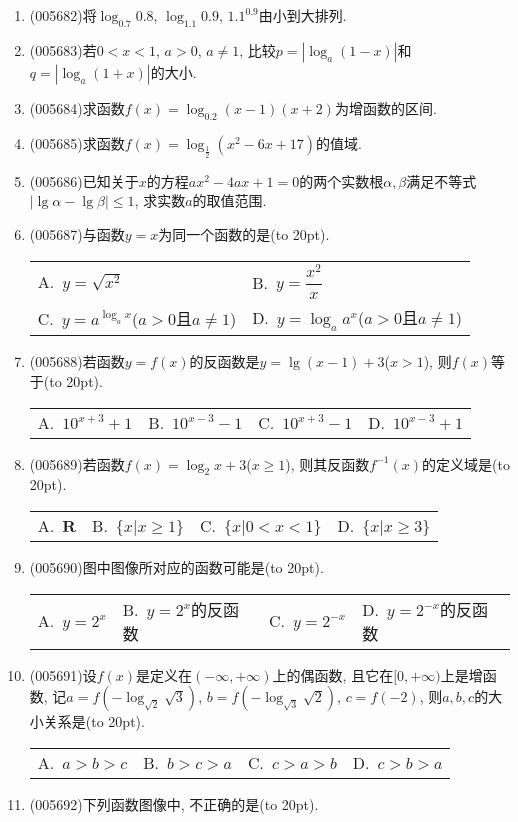 \documentclass[10pt,a4paper]{article}
\newcommand{\bracket}[1]{(\hbox to #1pt{})}
\newcommand{\twoch}[4]{\par\begin{tabular}{p{.46\textwidth}p{.46\textwidth}}
A.~#1& B.~#2\\
C.~#3& D.~#4
\end{tabular}}
\newcommand{\fourch}[4]{\par\begin{tabular}{p{.23\textwidth}p{.23\textwidth}p{.23\textwidth}p{.23\textwidth}}
A.~#1 &B.~#2& C.~#3& D.~#4
\end{tabular}}
\begin{document}
\begin{enumerate}[1.]
\item {\tiny (005682)}将$\log_{0.7}0.8$, $\log_{1.1}0.9$, $1.1^{0.9}$由小到大排列.
\item {\tiny (005683)}若$0<x<1$, $a>0$, $a\ne 1$, 比较$p=|\log_a(1-x)|$和$q=|\log_a(1+x)|$的大小.
\item {\tiny (005684)}求函数$f(x)=\log_{0.2}(x-1)(x+2)$为增函数的区间.
\item {\tiny (005685)}求函数$f(x)=\log_{\frac 12}(x^2-6x+17)$的值域.
\item {\tiny (005686)}已知关于$x$的方程$ax^2-4ax+1=0$的两个实数根$\alpha ,\beta$满足不等式$|\lg \alpha -\lg \beta|\le 1$, 求实数$a$的取值范围.
\item {\tiny (005687)}与函数$y=x$为同一个函数的是\bracket{20}.
\twoch{$y=\sqrt {x^2}$}{$y=\dfrac{x^2}x$}{$y=a^{\log_ax}$($a>0$且$a\ne 1$)}{$y=\log_aa^x$($a>0$且$a\ne 1$)}
\item {\tiny (005688)}若函数$y=f(x)$的反函数是$y=\lg (x-1)+3$($x>1$), 则$f(x)$等于\bracket{20}.
\fourch{$10^{x+3}+1$}{$10^{x-3}-1$}{$10^{x+3}-1$}{$10^{x-3}+1$}
\item {\tiny (005689)}若函数$f(x)=\log_2x+3$($x\ge 1$), 则其反函数$f^{-1}(x)$的定义域是\bracket{20}.
\fourch{$\mathbf{R}$}{$\{x|x\ge 1\}$}{$\{x|0<x<1\}$}{$\{x|x\ge 3\}$}
\item {\tiny (005690)}图中图像所对应的函数可能是\bracket{20}.
\begin{center}
\end{center}
\fourch{$y=2^x$}{$y=2^x$的反函数}{$y=2^{-x}$}{$y=2^{-x}$的反函数}
\item {\tiny (005691)}设$f(x)$是定义在$(-\infty ,+\infty)$上的偶函数, 且它在$[0,+\infty)$上是增函数, 记$a=f(-\log_{\sqrt 2}\sqrt 3)$, $b=f(-\log_{\sqrt 3}\sqrt 2)$, $c=f(-2)$, 则$a,b,c$的大小关系是\bracket{20}.
\fourch{$a>b>c$}{$b>c>a$}{$c>a>b$}{$c>b>a$}
\item {\tiny (005692)}下列函数图像中, 不正确的是\bracket{20}.
\begin{center}
\end{center}
\end{enumerate}
\end{document}
